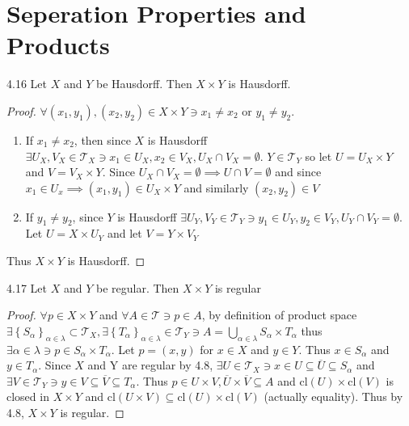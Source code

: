 \documentclass{article}
\newcommand*{\T}{\mathcal{T}}
\newcommand*{\cl}{\mathrm{cl}}
\begin{document}
\pagebreak

\section*{Seperation Properties and Products}
\begin{claim}{4.16}\label{Claim 4.16.}
    Let $X$ and $Y$ be Hausdorff. Then $X \times Y$ is Hausdorff.
\end{claim}
\begin{proof}
    $\forall (x_1, y_1), (x_2, y_2) \in X \times Y \ni x_1 \neq x_2$ or $y_1 \neq y_2$. 
    
    \begin{enumerate}
        \item If $x_1 \neq x_2$, then since $X$ is Hausdorff $\exists U_X, V_X \in \T_X \ni x_1 \in U_X,x_2 \in V_X, U_X \cap V_X = \emptyset$. $Y \in \T_Y$ so let $U = U_X \times Y$ and $V = V_X \times Y$. Since $U_X \cap V_X = \emptyset \implies U \cap V= \emptyset$ and since $x_1 \in U_x \implies (x_1, y_1) \in U_X \times Y$ and similarly $(x_2, y_2) \in V$
        \item If $y_1 \neq y_2$, since $Y$ is Hausdorff $\exists U_Y, V_Y \in \T_Y \ni y_1 \in U_Y, y_2 \in V_Y, U_Y \cap V_Y = \emptyset$. Let $U = X \times U_Y$ and let $V = Y \times V_Y$                
    \end{enumerate}

    Thus $X \times Y$ is Hausdorff. 
\end{proof}

\bigskip

\begin{claim}{4.17}\label{Claim 4.17.}
    Let $X$ and $Y$ be regular. Then $X \times Y$ is regular   
\end{claim}
\begin{proof}
    $\forall p \in X \times Y$ and $\forall A \in \T \ni p \in A$, by definition of product 
    space $\exists \left\{ S_{\alpha} \right\}_{\alpha \in \lambda} \subset \T_X, \exists \left\{ T_{\alpha} \right\}_{\alpha \in \lambda} \in \T_Y \ni A = \bigcup_{\alpha \in \lambda} S_\alpha \times T_\alpha$ thus $\exists \alpha \in \lambda \ni p \in S_\alpha \times T_\alpha$. Let $p = (x, y)$ for $x \in X$ and $y \in Y$. Thus $x \in S_\alpha$ and $y \in T_\alpha$. Since $X$ and Y are regular by 4.8, $\exists U \in \T_X \ni x \in U \subseteq \overline{U} \subseteq S_\alpha$ and $\exists V \in \T_Y \ni y \in V \subseteq \overline{V} \subseteq T_\alpha$. Thus $p \in U \times V , \overline{U} \times \overline{V} \subseteq A$ and $\cl(U) \times \cl(V)$ is closed in $X \times Y$ and $\cl(U \times V) \subseteq \cl(U) \times \cl(V)$ (actually equality). Thus by 4.8, $X \times Y$ is regular.               
\end{proof}
\end{document}
